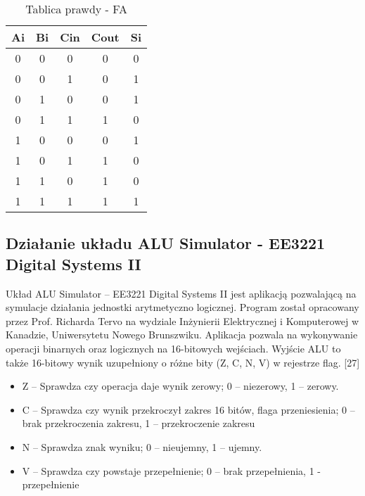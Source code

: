 \documentclass[12pt, a4paper, onside, polish]{article}				%
\begin{document}
\begin{table}
\noindent
\caption{Tablica prawdy - FA}
\centering
\begin{tabular}{|c|c|c|c|c|}
\hline
\textbf{Ai} & \textbf{Bi} & \textbf{Cin} & \textbf{Cout} & \textbf{Si} \\ \hline
0           & 0           & 0            & 0             & 0           \\ \hline
0           & 0           & 1            & 0             & 1           \\ \hline
0           & 1           & 0            & 0             & 1           \\ \hline
0           & 1           & 1            & 1             & 0           \\ \hline
1           & 0           & 0            & 0             & 1           \\ \hline
1           & 0           & 1            & 1             & 0           \\ \hline
1           & 1           & 0            & 1             & 0           \\ \hline
1           & 1           & 1            & 1             & 1           \\ \hline 
\end{tabular}
\vspace{0.5cm}
\end{table}

\subsection{Działanie układu ALU Simulator - EE3221 Digital Systems II}
\hspace{\parindent}
Układ ALU Simulator – EE3221 Digital Systems II jest aplikacją pozwalającą na symulacje działania jednostki arytmetyczno logicznej. Program został opracowany przez Prof. Richarda Tervo na wydziale Inżynierii Elektrycznej i Komputerowej w Kanadzie, Uniwersytetu Nowego Brunszwiku. Aplikacja pozwala na wykonywanie operacji binarnych oraz logicznych na 16-bitowych wejściach. Wyjście ALU to także 16-bitowy wynik uzupełniony o różne bity (Z, C, N, V) w rejestrze flag. [27]
\begin{itemize}
\item Z – Sprawdza czy operacja daje wynik zerowy; 0 – niezerowy, 1 – zerowy.
\item C – Sprawdza czy wynik przekroczył zakres 16 bitów, flaga przeniesienia; 0 – brak przekroczenia zakresu, 1 – przekroczenie zakresu
\item N – Sprawdza znak wyniku; 0 – nieujemny, 1 – ujemny.
\item V – Sprawdza czy powstaje przepełnienie; 0 – brak przepełnienia, 1 - przepełnienie \newline
\end{itemize}
\end{document}
